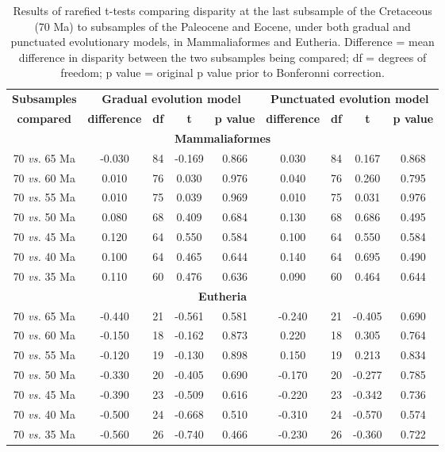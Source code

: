 \documentclass[12pt,letterpaper]{article}
\begin{document}
\begin{table}[ht]
\caption{\tiny{Results of rarefied t-tests comparing disparity at the last subsample of the Cretaceous (70 Ma) to subsamples of the Paleocene and Eocene, under both gradual and punctuated evolutionary models, in Mammaliaformes and Eutheria. Difference = mean difference in disparity between the two subsamples being compared; df = degrees of freedom; p value = original p value prior to Bonferonni correction.}}
\label{tab:Tab_beck}
\centering
\begin{tabular}{c|cccc|cccc}
  \hline
  \textbf{Subsamples} & \multicolumn{4}{c|}{\textbf{Gradual evolution model}} & \multicolumn{4}{c}{\textbf{Punctuated evolution model}} \\
  \textbf{compared} & \textbf{difference} & \textbf{df} & \textbf{t} & \textbf{p value} & \textbf{difference} & \textbf{df} & \textbf{t} & \textbf{p value} \\ 
  \hline
  \multicolumn{9}{c}{\textbf{Mammaliaformes}}\\
  \hline
  70 \textit{vs.} 65 Ma & -0.030 & 84 & -0.169 & 0.866 & 0.030 & 84 & 0.167 & 0.868 \\ 
  70 \textit{vs.} 60 Ma & 0.010 & 76 & 0.030 & 0.976 & 0.040 & 76 & 0.260 & 0.795 \\ 
  70 \textit{vs.} 55 Ma & 0.010 & 75 & 0.039 & 0.969 & 0.010 & 75 & 0.031 & 0.976 \\ 
  70 \textit{vs.} 50 Ma & 0.080 & 68 & 0.409 & 0.684 & 0.130 & 68 & 0.686 & 0.495 \\ 
  70 \textit{vs.} 45 Ma & 0.120 & 64 & 0.550 & 0.584 & 0.100 & 64 & 0.550 & 0.584 \\ 
  70 \textit{vs.} 40 Ma & 0.100 & 64 & 0.465 & 0.644 & 0.140 & 64 & 0.695 & 0.490 \\ 
  70 \textit{vs.} 35 Ma & 0.110 & 60 & 0.476 & 0.636 & 0.090 & 60 & 0.464 & 0.644 \\ 
  \hline
  \multicolumn{9}{c}{\textbf{Eutheria}}\\
  \hline
  70 \textit{vs.} 65 Ma & -0.440 & 21 & -0.561 & 0.581 & -0.240 & 21 & -0.405 & 0.690 \\ 
  70 \textit{vs.} 60 Ma & -0.150 & 18 & -0.162 & 0.873 & 0.220 & 18 & 0.305 & 0.764 \\ 
  70 \textit{vs.} 55 Ma & -0.120 & 19 & -0.130 & 0.898 & 0.150 & 19 & 0.213 & 0.834 \\ 
  70 \textit{vs.} 50 Ma & -0.330 & 20 & -0.405 & 0.690 & -0.170 & 20 & -0.277 & 0.785 \\ 
  70 \textit{vs.} 45 Ma & -0.390 & 23 & -0.509 & 0.616 & -0.220 & 23 & -0.342 & 0.736 \\ 
  70 \textit{vs.} 40 Ma & -0.500 & 24 & -0.668 & 0.510 & -0.310 & 24 & -0.570 & 0.574 \\ 
  70 \textit{vs.} 35 Ma & -0.560 & 26 & -0.740 & 0.466 & -0.230 & 26 & -0.360 & 0.722 \\ 
   \hline
\end{tabular}
\end{table}
\end{document}
